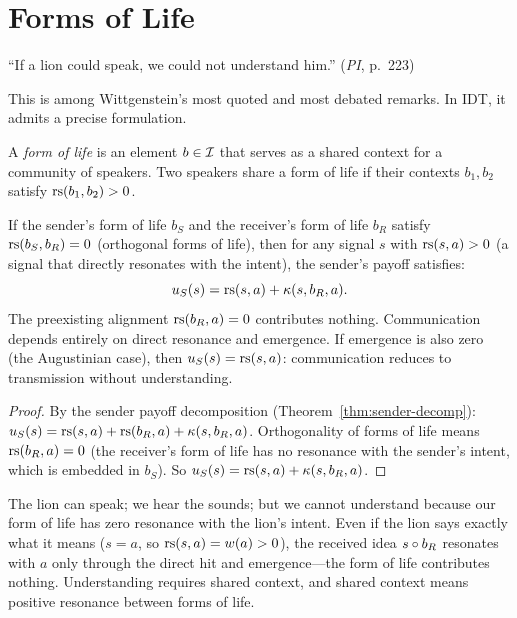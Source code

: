 \section{Forms of Life}

``If a lion could speak, we could not understand him.'' (\emph{PI}, p.~223)

This is among Wittgenstein's most quoted and most debated remarks. In IDT, it
admits a precise formulation.

\begin{definition}
\label{def:form-of-life}
A \emph{form of life} is an element $b \in \mathcal{I}$ that serves as a shared
context for a community of speakers. Two speakers share a form of life if
their contexts $b_1, b_2$ satisfy $\mathrm{rs}(b_1, b_2) > 0$.
\end{definition}

\begin{theorem}
\label{thm:lion}
If the sender's form of life $b_S$ and the receiver's form of life $b_R$
satisfy $\mathrm{rs}(b_S, b_R) = 0$ (orthogonal forms of life), then for any signal
$s$ with $\mathrm{rs}(s, a) > 0$ (a signal that directly resonates with the intent),
the sender's payoff satisfies:
\[
u_S(s) = \mathrm{rs}(s, a) + \kappa(s, b_R, a).
\]
The preexisting alignment $\mathrm{rs}(b_R, a) = 0$ contributes nothing. Communication
depends entirely on direct resonance and emergence. If emergence is also zero
(the Augustinian case), then $u_S(s) = \mathrm{rs}(s, a)$: communication reduces
to transmission without understanding.
\end{theorem}

\begin{proof}
By the sender payoff decomposition (Theorem~\ref{thm:sender-decomp}):
$u_S(s) = \mathrm{rs}(s, a) + \mathrm{rs}(b_R, a) + \kappa(s, b_R, a)$.
Orthogonality of forms of life means $\mathrm{rs}(b_R, a) = 0$ (the receiver's form
of life has no resonance with the sender's intent, which is embedded in
$b_S$). So $u_S(s) = \mathrm{rs}(s, a) + \kappa(s, b_R, a)$.
\end{proof}

\begin{interpretation}
The lion can speak; we hear the sounds; but we cannot understand because our
form of life has zero resonance with the lion's intent. Even if the lion
says exactly what it means ($s = a$, so $\mathrm{rs}(s, a) = w(a) > 0$), the
received idea $s \circ b_R$ resonates with $a$ only through the direct
hit and emergence---the form of life contributes nothing. Understanding
requires shared context, and shared context means positive resonance between
forms of life.
\end{interpretation}

